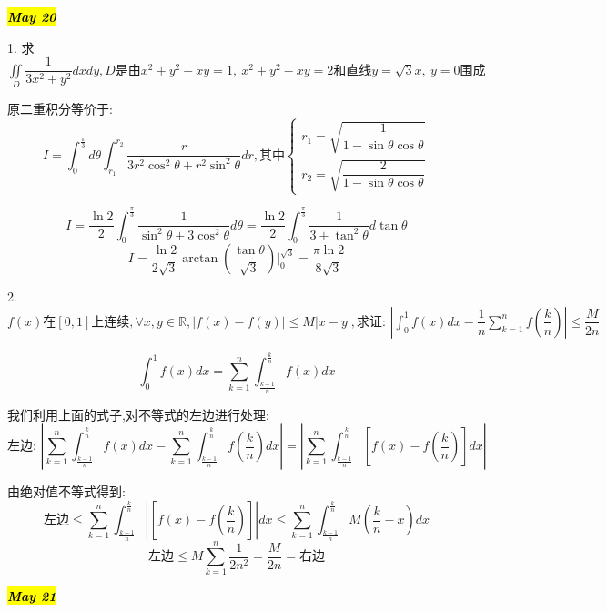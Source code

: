 \hl{\textbf{\textit{May 20}}}

1. 求$\iint\limits_{D}\dfrac{1}{3x^2+y^2}dxdy,D\text{是由}x^2+y^2-xy=1,\ x^2+y^2-xy=2\text{和直线}y=\sqrt{3}x,\ y=0\text{围成}$
\begin{solution}
	
	原二重积分等价于: 
	$$I=\int_{0}^{\frac{\pi}{3}}d\theta\int_{r_{1}}^{r_{2}}\dfrac{r}{3r^2\cos ^2\theta+r^2\sin^2\theta}dr,\text{其中}\left\lbrace 
	\begin{array}{l}
		r_{1}=\sqrt{\dfrac{1}{1-\sin \theta\cos\theta}}\\
		r_{2}=\sqrt{\dfrac{2}{1-\sin \theta\cos\theta}}
	\end{array}
	\right. $$
	
	$$I=\frac{\ln 2}{2}\int_{0}^{\frac{\pi}{3}}\dfrac{1}{\sin^2\theta+3\cos^2\theta}d\theta=\frac{\ln 2}{2}\int_{0}^{\frac{\pi}{3}}\dfrac{1}{3+\tan^2\theta}d\tan \theta$$
	$$I=\frac{\ln 2}{2\sqrt{3}}\arctan(\frac{\tan\theta}{\sqrt{3}})|_{0}^{\sqrt{3}}=\frac{\pi \ln 2}{8\sqrt{3}}$$
\end{solution}

2. $f(x)\text{在}[0,1]\text{上连续},\forall x,y\in \mathbb{R} ,|f(x)-f(y)|\leq M|x-y|,\text{求证: }\left| \int_{0}^{1}f(x)dx-\dfrac{1}{n}\sum\limits_{k=1}^{n}f(\dfrac{k}{n})\right|\leq \dfrac{M}{2n} $
\begin{solution}
	\begin{lemma}[积分和求和]
		
		$$\int_{0}^{1}f(x)dx=\sum\limits_{k=1}^{n}\int_{\frac{k-1}{n}}^{\frac{k}{n}}f(x)dx$$
	\end{lemma}
	我们利用上面的式子,对不等式的左边进行处理: 
	$$\text{左边: }\left| \sum\limits_{k=1}^{n}\int_{\frac{k-1}{n}}^{\frac{k}{n}}f(x)dx-\sum\limits_{k=1}^{n}\int_{\frac{k-1}{n}}^{\frac{k}{n}}f(\frac{k}{n})dx\right|=\left|\sum\limits_{k=1}^{n}\int_{\frac{k-1}{n}}^{\frac{k}{n}}[f(x)-f(\frac{k}{n})]dx\right|$$
	
	由绝对值不等式得到: 
	$$\text{左边}\leq \sum\limits_{k=1}^{n}\int_{\frac{k-1}{n}}^{\frac{k}{n}}\left|  [f(x)-f(\frac{k}{n})]\right|dx\leq  \sum\limits_{k=1}^{n}\int_{\frac{k-1}{n}}^{\frac{k}{n}}M(\frac{k}{n}-x)dx$$
	$$\text{左边}\leq M\sum\limits_{k=1}^{n}\frac{1}{2n^2}=\dfrac{M}{2n}=\text{右边} $$
\end{solution}

\hl{\textbf{\textit{May 21}}}

